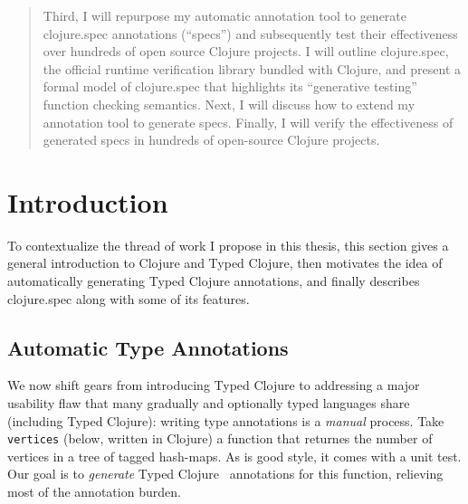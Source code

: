 \documentclass[9pt]{extarticle}
\begin{document}
\begin{abstract}
Third, I will repurpose my automatic annotation tool to generate clojure.spec annotations (``specs'')
and subsequently test their effectiveness over hundreds of open source Clojure projects.
I will outline clojure.spec, the official runtime verification
library bundled with Clojure, and present a formal model of clojure.spec that highlights its
``generative testing'' function checking semantics.
Next, I will discuss how to extend my annotation tool to generate specs.
Finally, I will verify the effectiveness of generated specs in hundreds of open-source Clojure projects.
\end{abstract}

%
%

\section{Introduction}

To contextualize the thread of work I propose in this thesis, this section
gives a general introduction to Clojure and Typed Clojure,
then motivates the idea of automatically generating Typed Clojure annotations,
and finally describes clojure.spec along with some of its features.




\subsection{Automatic Type Annotations}


We now shift gears from introducing Typed Clojure to
addressing a major usability flaw that many
gradually and optionally typed languages share (including Typed Clojure):
writing type annotations is a \emph{manual} process.
%
Take \texttt{vertices} (below, written in Clojure)
a function that returnes the number of vertices
in a tree of tagged hash-maps.
As is good style, it comes with a unit test.
Our goal is to \textit{generate} Typed Clojure~\cite{bonnaire2016practical}
annotations
for this function, relieving most of the annotation
burden.
\end{document}
